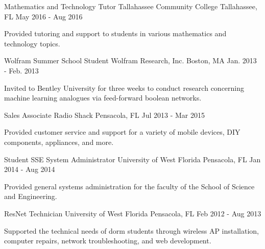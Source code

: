 \begin{cventries}
  \cventry
    {Mathematics and Technology Tutor} %
    {Tallahassee Community College} %
    {Tallahassee, FL} %
    {May 2016 - Aug 2016} %
    {
      \begin{cvitems} %
        \item {Provided tutoring and support to students in various mathematics and technology topics.}
      \end{cvitems}
    }

  \cventry
    {Wolfram Summer School Student} %
    {Wolfram Research, Inc.} %
    {Boston, MA} %
    {Jan. 2013 - Feb. 2013} %
    {
      \begin{cvitems} %
        \item {Invited to Bentley University for three weeks to conduct research concerning machine learning analogues via feed-forward boolean networks.}
      \end{cvitems}
    }

  \cventry
    {Sales Associate} %
    {Radio Shack} %
    {Pensacola, FL} %
    {Jul 2013 - Mar 2015} %
    {
      \begin{cvitems} %
        \item {Provided customer service and support for a variety of mobile devices, DIY components, appliances, and more.}
      \end{cvitems}
    }

  \cventry
    {Student SSE System Administrator} %
    {University of West Florida} %
    {Pensacola, FL} %
    {Jan 2014 - Aug 2014} %
    {
      \begin{cvitems} %
        \item {Provided general systems administration for the faculty of the School of Science and Engineering.}
      \end{cvitems}
    }

  \cventry
    {ResNet Technician} %
    {University of West Florida} %
    {Pensacola, FL} %
    {Feb 2012 - Aug 2013} %
    {
      \begin{cvitems} %
        \item {Supported the technical needs of dorm students through wireless AP installation, computer repairs, network troubleshooting, and web development.}
      \end{cvitems}
    }

\end{cventries}
